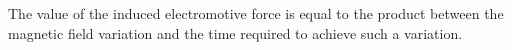 The value of the induced electromotive force is equal to the product between the 
magnetic field variation and the time
required to achieve such a variation.